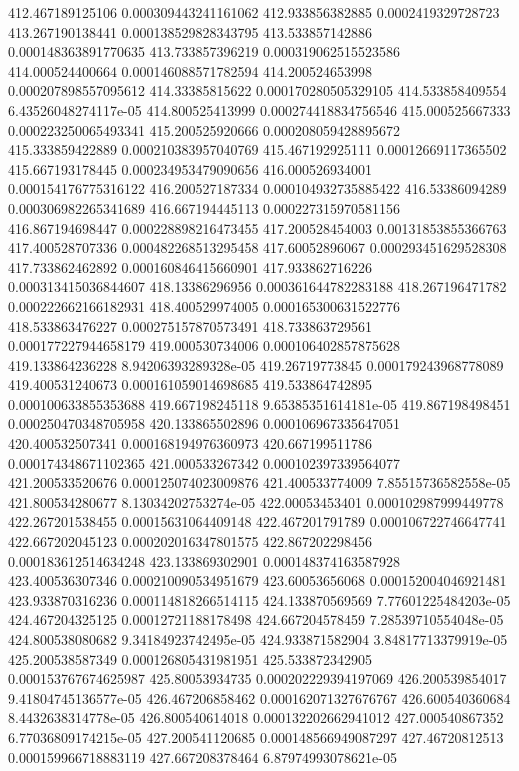 {412.467189125106 0.000309443241161062
412.933856382885 0.0002419329728723
413.267190138441 0.000138529828343795
413.533857142886 0.000148363891770635
413.733857396219 0.000319062515523586
414.000524400664 0.000146088571782594
414.200524653998 0.000207898557095612
414.33385815622 0.000170280505329105
414.533858409554 6.43526048274117e-05
414.800525413999 0.000274418834756546
415.000525667333 0.000223250065493341
415.200525920666 0.000208059428895672
415.333859422889 0.000210383957040769
415.467192925111 0.00012669117365502
415.667193178445 0.000234953479090656
416.000526934001 0.000154176775316122
416.200527187334 0.000104932735885422
416.53386094289 0.000306982265341689
416.667194445113 0.000227315970581156
416.867194698447 0.000228898216473455
417.200528454003 0.00131853855366763
417.400528707336 0.000482268513295458
417.60052896067 0.000293451629528308
417.733862462892 0.000160846415660901
417.933862716226 0.000313415036844607
418.13386296956 0.000361644782283188
418.267196471782 0.000222662166182931
418.400529974005 0.000165300631522776
418.533863476227 0.000275157870573491
418.733863729561 0.000177227944658179
419.000530734006 0.000106402857875628
419.133864236228 8.94206393289328e-05
419.26719773845 0.000179243968778089
419.400531240673 0.000161059014698685
419.533864742895 0.000100633855353688
419.667198245118 9.65385351614181e-05
419.867198498451 0.000250470348705958
420.133865502896 0.000106967335647051
420.400532507341 0.000168194976360973
420.667199511786 0.000174348671102365
421.000533267342 0.000102397339564077
421.200533520676 0.000125074023009876
421.400533774009 7.85515736582558e-05
421.800534280677 8.13034202753274e-05
422.00053453401 0.000102987999449778
422.267201538455 0.00015631064409148
422.467201791789 0.000106722746647741
422.667202045123 0.000202016347801575
422.867202298456 0.000183612514634248
423.133869302901 0.000148374163587928
423.400536307346 0.000210090534951679
423.60053656068 0.000152004046921481
423.933870316236 0.000114818266514115
424.133870569569 7.77601225484203e-05
424.467204325125 0.00012721188178498
424.667204578459 7.28539710554048e-05
424.800538080682 9.34184923742495e-05
424.933871582904 3.84817713379919e-05
425.200538587349 0.000126805431981951
425.533872342905 0.000153767674625987
425.80053934735 0.000202229394197069
426.200539854017 9.41804745136577e-05
426.467206858462 0.000162071327676767
426.600540360684 8.4432638314778e-05
426.800540614018 0.000132202662941012
427.000540867352 6.77036809174215e-05
427.200541120685 0.000148566949087297
427.46720812513 0.000159966718883119
427.667208378464 6.87974993078621e-05
}
